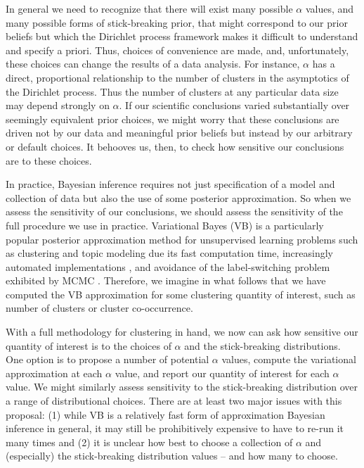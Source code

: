 In general we need to recognize that there will exist many possible $\alpha$ values,
and many possible forms of stick-breaking prior, that might correspond to our prior
beliefs but which the Dirichlet process framework makes it difficult to understand
and specify a priori.  Thus, choices of convenience are made, and, unfortunately,
these choices can change the results of a data analysis. For instance, $\alpha$
has a direct, proportional relationship to the number of clusters in the asymptotics
of the Dirichlet process. Thus the number of clusters at any particular data size may
depend strongly on $\alpha$. If our scientific conclusions varied substantially over
seemingly equivalent prior choices, we might worry that these conclusions are
driven not by our data and meaningful prior beliefs but instead by our arbitrary
or default choices. It behooves us, then, to check how sensitive our conclusions
are to these choices.

In practice, Bayesian inference requires not just specification of a model and
collection of data but also the use of some posterior approximation. So when we
assess the sensitivity of our conclusions, we should assess the sensitivity of
the full procedure we use in practice. Variational Bayes (VB) is a particularly
popular posterior approximation method for unsupervised learning problems such
as clustering and topic modeling due its fast computation time, increasingly
automated implementations \citep{ranganath:2013:black, kucukelbir:2016:advi},
and avoidance of the label-switching problem exhibited by MCMC
\citep{jasra:2005:mcmclabelswitch}. Therefore, we imagine in what follows that
we have computed the VB approximation for some clustering quantity of interest,
such as number of clusters or cluster co-occurrence.

With a full methodology for clustering in hand, we now can ask how sensitive our
quantity of interest is to the choices of $\alpha$ and the stick-breaking
distributions. One option is to propose a number of potential $\alpha$ values,
compute the variational approximation at each $\alpha$ value, and report our
quantity of interest for each $\alpha$ value. We might similarly assess
sensitivity to the stick-breaking distribution over a range of distributional
choices. There are at least two major issues with this proposal: (1) while VB is
a relatively fast form of approximation Bayesian inference in general, it may
still be prohibitively expensive to have to re-run it many times and (2) it is
unclear how best to choose a collection of $\alpha$ and (especially) the
stick-breaking distribution values -- and how many to choose.

